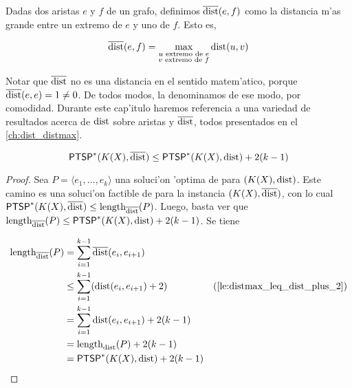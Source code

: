 \begin{definition}
\label{de:distmax}
Dadas dos aristas $e$ y $f$ de un grafo, definimos $\overline{\textnormal{dist}}(e, f)$ como la distancia m'as grande entre un extremo de $e$ y uno de $f$. Esto es,

\[\overline{\textnormal{dist}}(e, f) = \max\limits_{\substack{u \text{ extremo de }e \\ v \text{ extremo de }f}} \textnormal{dist}(u, v)\]
\end{definition}

\noindent
Notar que $\overline{\textnormal{dist}}$ no es una distancia en el sentido matem'atico, porque $\overline{\textnormal{dist}}(e, e) = 1 \neq 0$. De todos modos, la denominamos de ese modo, por comodidad. Durante este cap'itulo haremos referencia a una variedad de resultados acerca de $\textnormal{dist}$ sobre aristas y $\overline{\textnormal{dist}}$, todos presentados en el \autoref{ch:dist_distmax}.

\begin{lemma}
\label{le:ptsp}
\[\textnormal{\textsf{PTSP}}^*(K(X), \overline{\textnormal{dist}}) \leq \textnormal{\textsf{PTSP}}^*(K(X), \textnormal{dist}) + 2(k - 1)\]

\begin{proof}
Sea $P = \langle e_1, \dots, e_k \rangle$ una soluci'on 'optima de  para $(K(X), \textnormal{dist})$. Este camino es una soluci'on factible de  para la instancia $(K(X), \overline{\textnormal{dist}})$, con lo cual $\textnormal{\textsf{PTSP}}^*(K(X), \overline{\textnormal{dist}}) \leq \textnormal{length}_{\overline{\textnormal{dist}}}(P)$. Luego, basta ver que $\textnormal{length}_{\overline{\textnormal{dist}}}(P) \leq \textnormal{\textsf{PTSP}}^*(K(X), \textnormal{dist}) + 2(k - 1)$. Se tiene

\begin{align*}
\length_{\distmax}(P) &= \sum_{i = 1}^{k - 1} \distmax(e_i, e_{i + 1}) &\\
&\leq \sum_{i = 1}^{k - 1} (\dist(e_i, e_{i + 1}) + 2) & \text{(\autoref{le:distmax_leq_dist_plus_2})}\\
&= \sum_{i = 1}^{k - 1} \dist(e_i, e_{i + 1}) + 2(k - 1)&\\
&= \length_{\dist}(P) + 2(k - 1)&\\
&= \problem{PTSP}^*(K(X), \dist) + 2(k - 1)&
\end{align*}
\end{proof}
\end{lemma}

